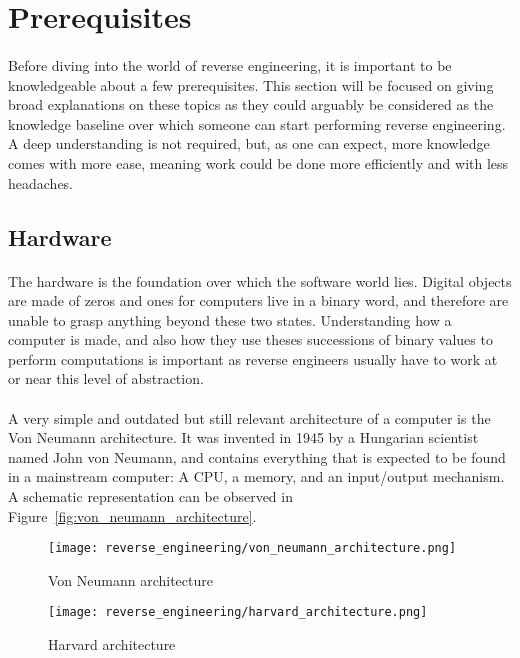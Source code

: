 \section{Prerequisites}
\paragraph{}
Before diving into the world of reverse engineering, it is important to be knowledgeable about a few prerequisites. This section will be focused on giving broad explanations on these topics as they could arguably be considered as the knowledge baseline over which someone can start performing reverse engineering. A deep understanding is not required, but, as one can expect, more knowledge comes with more ease, meaning work could be done more efficiently and with less headaches.

\subsection{Hardware}
\paragraph{}
The hardware is the foundation over which the software world lies. Digital objects are made of zeros and ones for computers live in a binary word, and therefore are unable to grasp anything beyond these two states. Understanding how a computer is made, and also how they use theses successions of binary values to perform computations is important as reverse engineers usually have to work at or near this level of abstraction.

\paragraph{}
A very simple and outdated but still relevant architecture of a computer is the Von Neumann architecture. It was invented in 1945 by a Hungarian scientist named John von Neumann, and contains everything that is expected to be found in a mainstream computer: A CPU, a memory, and an input/output mechanism. A schematic representation can be observed in Figure~\ref{fig:von_neumann_architecture}.

\begin{figure}[!htb]
	\begin{minipage}[b]{0.4\textwidth}
		\centering
		\texttt{[image: reverse\_engineering/von\_neumann\_architecture.png]}
		\caption{Von Neumann architecture}
		\label{fig:von_neumann_architecture}
	\end{minipage}
	\hfill
	\begin{minipage}[b]{0.4\textwidth}
		\centering
		\texttt{[image: reverse\_engineering/harvard\_architecture.png]}
		\caption{Harvard architecture}
		\label{fig:harvard_architecture}
	\end{minipage}
\end{figure}

